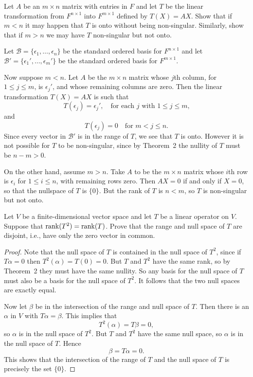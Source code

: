  Let $A$ be an $m\times n$ matrix with entries in $F$ and
let $T$ be the linear transformation from $F^{n\times1}$ into
$F^{m\times1}$ defined by $T(X) = AX$. Show that if $m < n$ it may
happen that $T$ is onto without being non-singular. Similarly, show
that if $m > n$ we may have $T$ non-singular but not onto.
\begin{solution}
  Let $\mathcal{B} = \{\epsilon_1,\dots,\epsilon_n\}$ be the standard
  ordered basis for $F^{n\times1}$ and let
  $\mathcal{B}' = \{\epsilon_1',\dots,\epsilon_m'\}$ be the standard
  ordered basis for $F^{m\times1}$.

  Now suppose $m < n$. Let $A$ be the $m\times n$ matrix whose $j$th
  column, for $1\leq j\leq m$, is $\epsilon_j'$, and whose remaining
  columns are zero. Then the linear transformation $T(X) = AX$ is such
  that
  \begin{equation*}
    T(\epsilon_j) = \epsilon_j', \quad
    \text{for each $j$ with $1\leq j\leq m$,}
  \end{equation*}
  and
  \begin{equation*}
    T(\epsilon_j) = 0 \quad
    \text{for $m<j\leq n$.}
  \end{equation*}
  Since every vector in $\mathcal{B}'$ is in the range of $T$, we see
  that $T$ is onto. However it is not possible for $T$ to be
  non-singular, since by Theorem~2 the nullity of $T$ must be
  $n - m > 0$.

  On the other hand, assume $m > n$. Take $A$ to be the $m\times n$
  matrix whose $i$th row is $\epsilon_i$ for $1\leq i\leq n$, with
  remaining rows zero. Then $AX = 0$ if and only if $X = 0$, so that
  the nullspace of $T$ is $\{0\}$. But the rank of $T$ is $n < m$, so
  $T$ is non-singular but not onto.
\end{solution}

 Let $V$ be a finite-dimensional vector space and let $T$
be a linear operator on $V$. Suppose that $\operatorname{rank}(T^2) =
\operatorname{rank}(T)$. Prove that the range and null space of $T$ are disjoint,
i.e., have only the zero vector in common.
\begin{proof}
  Note that the null space of $T$ is contained in the null space of
  $T^2$, since if $T\alpha = 0$ then $T^2(\alpha) = T(0) = 0$. But $T$
  and $T^2$ have the same rank, so by Theorem~2 they must have the
  same nullity. So any basis for the null space of $T$ must also be a
  basis for the null space of $T^2$. It follows that the two null
  spaces are exactly equal.

  Now let $\beta$ be in the intersection of the range and null space
  of $T$. Then there is an $\alpha$ in $V$ with $T\alpha =
  \beta$. This implies that
  \begin{equation*}
    T^2(\alpha) = T\beta = 0,
  \end{equation*}
  so $\alpha$ is in the null space of $T^2$. But $T$ and $T^2$ have
  the same null space, so $\alpha$ is in the null space of $T$. Hence
  \begin{equation*}
    \beta = T\alpha = 0.
  \end{equation*}
  This shows that the intersection of the range of $T$ and the null
  space of $T$ is precisely the set $\{0\}$.
\end{proof}
